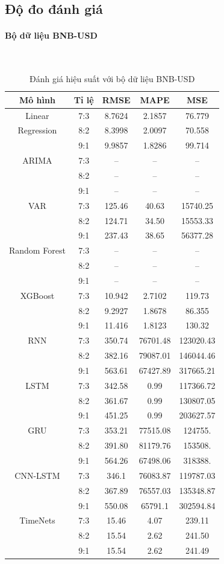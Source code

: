 \documentclass[conference]{IEEEtran}
\begin{document}
\subsection{Độ đo đánh giá}
\paragraph{\textbf{Bộ dữ liệu BNB-USD}} \mbox{} \\
\begin{table}[H]
 \centering
 \caption{Đánh giá hiệu suất với bộ dữ liệu BNB-USD}
\begin{adjustbox}{width=0.4\textwidth}
\begin{tabular}{|c|c|c|c|c|}
\hline
Mô hình & Tỉ lệ & RMSE & MAPE & MSE \\ \hline
Linear & 7:3 & 8.7624 & 2.1857 & 76.779 \\
Regression & 8:2 & 8.3998 & 2.0097 & 70.558 \\
& 9:1 & 9.9857 & 1.8286 & 99.714 \\ \hline
ARIMA & 7:3 & -- & -- & -- \\
& 8:2 & -- & -- & -- \\
& 9:1 & -- & -- & -- \\ \hline
VAR & 7:3 & 125.46 & 40.63 & 15740.25 \\
& 8:2 & 124.71 & 34.50 & 15553.33 \\
& 9:1 & 237.43 & 38.65 & 56377.28 \\ \hline
Random Forest & 7:3 & -- & -- & -- \\
& 8:2 & -- & -- & -- \\
& 9:1 & -- & -- & -- \\ \hline
XGBoost & 7:3 & 10.942 & 2.7102 & 119.73 \\
& 8:2 & 9.2927 & 1.8678 & 86.355 \\
& 9:1 & 11.416 & 1.8123 & 130.32 \\ \hline
RNN & 7:3 & 350.74 & 76701.48 & 123020.43 \\
& 8:2 & 382.16 & 79087.01 & 146044.46 \\
& 9:1 & 563.61 & 67427.89 & 317665.21 \\ \hline
LSTM & 7:3 & 342.58 & 0.99 & 117366.72 \\
& 8:2 & 361.67 & 0.99 & 130807.05 \\
& 9:1 & 451.25 & 0.99 & 203627.57 \\ \hline
GRU & 7:3 & 353.21 & 77515.08 & 124755. \\
& 8:2 & 391.80 & 81179.76 & 153508. \\
& 9:1 & 564.26 & 67498.06 & 318388. \\ \hline
CNN-LSTM & 7:3 & 346.1 & 76083.87 & 119787.03 \\
& 8:2 & 367.89 & 76557.03 & 135348.87 \\
& 9:1 & 550.08 & 65791.1 & 302594.84 \\ \hline
TimeNets & 7:3 & 15.46 & 4.07 & 239.11 \\
& 8:2 & 15.54 & 2.62 & 241.50 \\
& 9:1 & 15.54 & 2.62 & 241.49 \\ \hline


\end{tabular}
\end{adjustbox}
\end{table}
\end{document}

